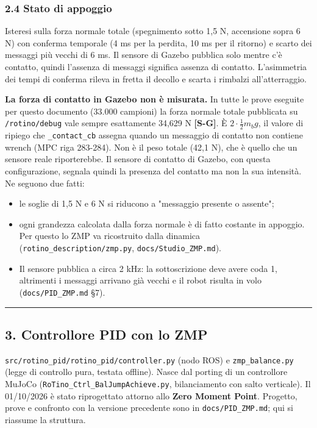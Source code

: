 \documentclass[
]{article}
\providecommand{\tightlist}{%
  \setlength{\itemsep}{0pt}\setlength{\parskip}{0pt}}
\begin{document}
\subsubsection{2.4 Stato di appoggio}\label{24-stato-di-appoggio}

Isteresi sulla forza normale totale (spegnimento sotto 1,5 N, accensione sopra 6 N) con conferma temporale (4 ms per la perdita, 10 ms per il ritorno) e scarto dei messaggi più vecchi di 6 ms. Il sensore di Gazebo pubblica solo mentre c'è contatto, quindi l'assenza di messaggi significa assenza di contatto. L'asimmetria dei tempi di conferma rileva in fretta il decollo e scarta i rimbalzi all'atterraggio.

\textbf{La forza di contatto in Gazebo non è misurata.} In tutte le prove eseguite per questo documento (33.000 campioni) la forza normale totale pubblicata su \texttt{/rotino/debug} vale sempre esattamente 34,629 N \textbf{[S-G]}. È \(2\cdot\tfrac12 m_bg\), il valore di ripiego che \texttt{\_contact\_cb} assegna quando un messaggio di contatto non contiene wrench (MPC riga 283-284). Non è il peso totale (42,1 N), che è quello che un sensore reale riporterebbe. Il sensore di contatto di Gazebo, con questa configurazione, segnala quindi la presenza del contatto ma non la sua intensità. Ne seguono due fatti:

\begin{itemize}
\tightlist
\item le soglie di 1,5 N e 6 N si riducono a "messaggio presente o assente";
\item ogni grandezza calcolata dalla forza normale è di fatto costante in appoggio. Per questo lo ZMP va ricostruito dalla dinamica (\texttt{rotino\_description/zmp.py}, \texttt{docs/Studio\_ZMP.md}).
\item Il sensore pubblica a circa 2 kHz: la sottoscrizione deve avere coda 1, altrimenti i messaggi arrivano già vecchi e il robot risulta in volo (\texttt{docs/PID\_ZMP.md} §7).
\end{itemize}

\begin{center}\rule{0.5\linewidth}{0.5pt}\end{center}

\subsection{3. Controllore PID con lo ZMP}\label{3-controllore-pid-con-lo-zmp}

\texttt{src/rotino\_pid/rotino\_pid/controller.py} (nodo ROS) e \texttt{zmp\_balance.py} (legge di controllo pura, testata offline). Nasce dal porting di un controllore MuJoCo (\texttt{RoTino\_Ctrl\_BalJumpAchieve.py}, bilanciamento con salto verticale). Il 01/10/2026 è stato riprogettato attorno allo \textbf{Zero Moment Point}. Progetto, prove e confronto con la versione precedente sono in \texttt{docs/PID\_ZMP.md}; qui si riassume la struttura.
\end{document}
